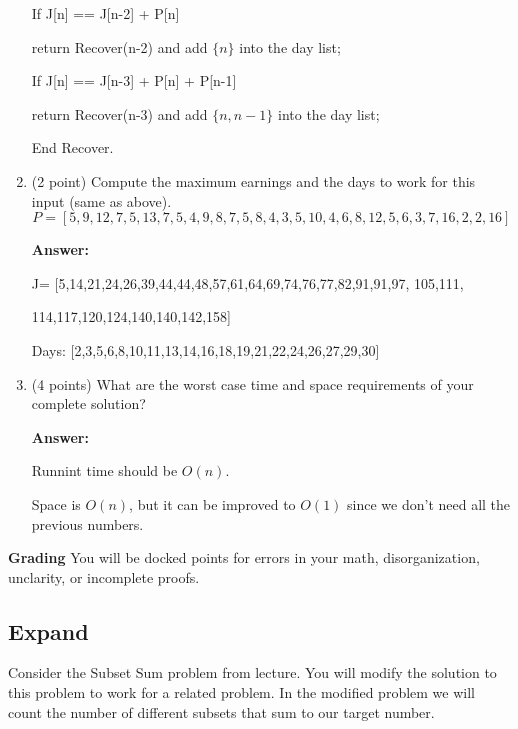 \documentclass[paper=a4, fontsize=11pt]{scrartcl}
\newcommand\tab[1][0.6cm]{\hspace*{#1}}
\numberwithin{equation}{section}		%
\numberwithin{figure}{section}			%
\numberwithin{table}{section}				%
\begin{document}
\begin{enumerate}
\tab If J[n] == J[n-2] + P[n]

\tab \tab return Recover(n-2) and add $\{n\}$ into the day list;

\tab If J[n] == J[n-3] + P[n] + P[n-1]

\tab \tab return Recover(n-3) and add $\{n, n-1\}$ into the day list;

End Recover.


\item (2 point) Compute the maximum earnings and the days to work for this input (same as above).
\[
P=[5,9,12,7,5,13,7,5,4,9,8,7,5,8,4,3,5,10,4,6,8,12,5,6,3,7,16,2,2,16]
\]

\textbf{Answer:}

J= [5,14,21,24,26,39,44,44,48,57,61,64,69,74,76,77,82,91,91,97, 105,111,

\tab 114,117,120,124,140,140,142,158]

Days: [2,3,5,6,8,10,11,13,14,16,18,19,21,22,24,26,27,29,30]

\item (4 points) What are the worst case time and space requirements of your complete solution?

\textbf{Answer:}

Runnint time should be $O(n)$.

Space is $O(n)$, but it can be improved to $O(1)$ since we don't need all the previous numbers.


\end{enumerate}

\noindent\textbf{Grading} You will be docked points for errors in your math, disorganization, unclarity, or incomplete proofs. 

\subsection{Expand}

Consider the Subset Sum problem from lecture.  You will modify the solution to this problem to work for a related problem.  In the modified problem we will count the number of different subsets that sum to our target number.  
\end{document}
